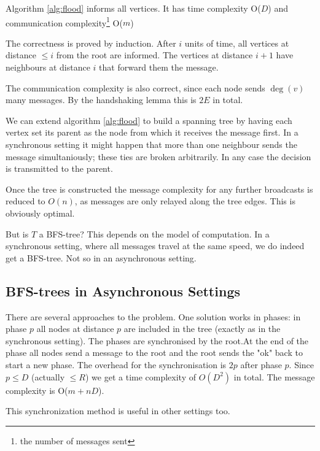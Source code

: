 \begin{thm} Algorithm \ref{alg:flood} informs all vertices. It has time complexity O($D$) and communication complexity\footnote{the number of messages sent} O($m$)
\end{thm}

\begin{pr} The correctness is proved by induction. After $i$ units of time, all vertices at distance $\leq i$ from the root are informed. The vertices at distance $i+1$ have neighbours at distance $i$ that forward them the message.

The communication complexity is also correct, since each node sends $\deg(v)$ many messages. By the handshaking lemma this is $2E$ in total.
\end{pr}

We can extend algorithm \ref{alg:flood} to build a spanning tree by having each vertex set its parent as the node from which it receives the message first. In a synchronous setting it might happen that more than one neighbour sends the message simultaniously; these ties are broken arbitrarily. In any case the decision is transmitted to the parent.

Once the tree is constructed the message complexity for any further broadcasts is reduced to $O(n)$, as messages are only relayed along the tree edges. This is obviously optimal.

But is $T$ a BFS-tree? This depends on the model of computation. In a synchronous setting, where all messages travel at the same speed, we do indeed get a BFS-tree. Not so in an asynchronous setting.

\subsection{BFS-trees in Asynchronous Settings}

There are several approaches to the problem. One solution works in phases: in phase $p$ all nodes at distance $p$ are included in the tree (exactly as in the synchronous setting). The phases are synchronised by the root.At the end of the phase all nodes send a message to the root and the root sends the "ok" back to start a new phase. The overhead for the synchronisation is $2p$ after phase $p$. Since $p\leq D$ (actually $\leq R$) we get a time complexity of $O(D^2)$ in total. The message complexity is O($m+nD$).

This synchronization method is useful in other settings too.